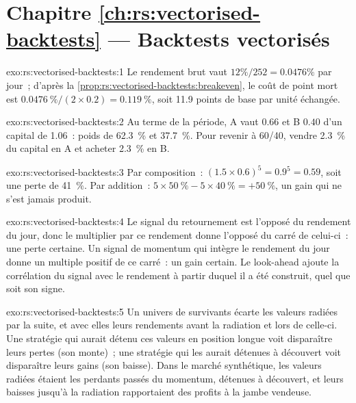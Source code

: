 \section*{Chapitre \ref{ch:rs:vectorised-backtests} --- Backtests vectorisés}

\begin{solution}{exo:rs:vectorised-backtests:1}
Le rendement brut vaut $12\%/252 = 0.0476\%$ par jour~; d'après la \cref{prop:rs:vectorised-backtests:breakeven}, le coût de point mort est
$0.0476~\%/(2 \times 0.2) = 0.119~\%$, soit 11.9 points de base par unité échangée.
\end{solution}

\begin{solution}{exo:rs:vectorised-backtests:2}
Au terme de la période, A vaut $0.66$ et B $0.40$ d'un capital de 1.06~: poids de 62.3~\% et 37.7~\%. Pour revenir à 60/40, vendre 2.3~\% du capital en A et acheter
2.3~\% en B.
\end{solution}

\begin{solution}{exo:rs:vectorised-backtests:3}
Par composition~: $(1.5 \times 0.6)^5 = 0.9^5 = 0.59$, soit une perte de 41~\%. Par addition~: $5 \times 50~\% - 5 \times 40~\% = +50~\%$, un gain qui ne s'est jamais produit.
\end{solution}

\begin{solution}{exo:rs:vectorised-backtests:4}
Le signal du retournement est l'opposé du rendement du jour, donc le multiplier par ce rendement donne l'opposé du carré de celui-ci~: une perte certaine. Un signal de momentum qui
intègre le rendement du jour donne un multiple positif de ce carré~: un gain certain. Le look-ahead ajoute la corrélation du signal avec le rendement à partir duquel il a été
construit, quel que soit son signe.
\end{solution}

\begin{solution}{exo:rs:vectorised-backtests:5}
Un univers de survivants écarte les valeurs radiées par la suite, et avec elles leurs rendements avant la radiation et lors de celle-ci. Une stratégie qui aurait détenu ces
valeurs en position longue voit disparaître leurs pertes (son  monte)~; une stratégie qui les aurait détenues à découvert voit disparaître leurs gains (son  baisse). Dans le marché synthétique, les
valeurs radiées étaient les perdants passés du momentum, détenues à découvert, et leurs baisses jusqu'à la radiation rapportaient des profits à la jambe vendeuse.
\end{solution}

